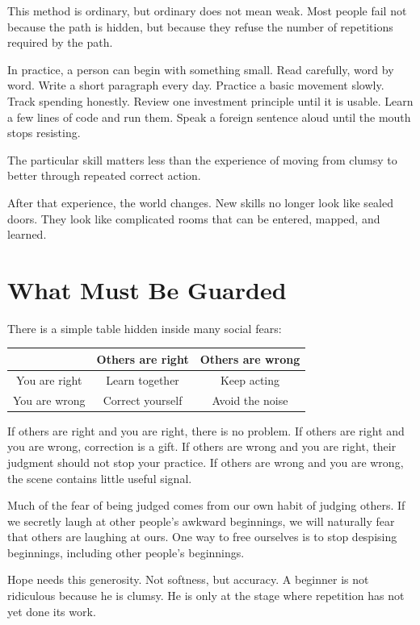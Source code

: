 This method is ordinary, but ordinary does not mean weak. Most people fail not because the path is hidden, but because they refuse the number of repetitions required by the path.

In practice, a person can begin with something small. Read carefully, word by word. Write a short paragraph every day. Practice a basic movement slowly. Track spending honestly. Review one investment principle until it is usable. Learn a few lines of code and run them. Speak a foreign sentence aloud until the mouth stops resisting.

The particular skill matters less than the experience of moving from clumsy to better through repeated correct action.

After that experience, the world changes. New skills no longer look like sealed doors. They look like complicated rooms that can be entered, mapped, and learned.

\section*{What Must Be Guarded}

There is a simple table hidden inside many social fears:

\begin{center}
\begin{tabular}{c|c|c}
 & Others are right & Others are wrong \\
\hline
You are right & Learn together & Keep acting \\
You are wrong & Correct yourself & Avoid the noise \\
\end{tabular}
\end{center}

If others are right and you are right, there is no problem. If others are right and you are wrong, correction is a gift. If others are wrong and you are right, their judgment should not stop your practice. If others are wrong and you are wrong, the scene contains little useful signal.

Much of the fear of being judged comes from our own habit of judging others. If we secretly laugh at other people's awkward beginnings, we will naturally fear that others are laughing at ours. One way to free ourselves is to stop despising beginnings, including other people's beginnings.

Hope needs this generosity. Not softness, but accuracy. A beginner is not ridiculous because he is clumsy. He is only at the stage where repetition has not yet done its work.

